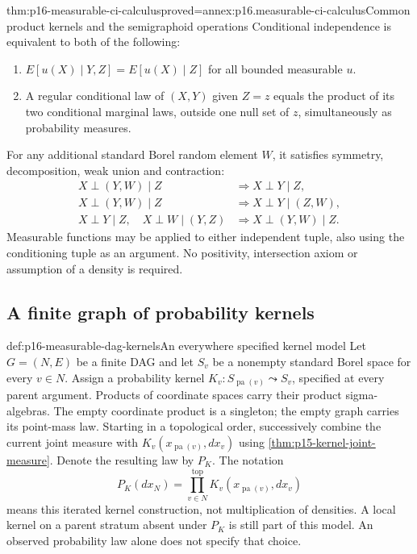 \begin{hbtheorem}{thm:p16-measurable-ci-calculus}{proved=annex:p16.measurable-ci-calculus}{Common product kernels and the semigraphoid operations}
Conditional independence is equivalent to both of the following:
\begin{enumerate}
\item \(E[u(X)\mid Y,Z]=E[u(X)\mid Z]\) for all bounded measurable \(u\).
\item A regular conditional law of \((X,Y)\) given \(Z=z\) equals
the product of its two conditional marginal laws, outside one null set
of \(z\), simultaneously as probability measures.
\end{enumerate}
For any additional standard Borel random element \(W\), it satisfies
symmetry, decomposition, weak union and contraction:
\[
\begin{aligned}
 X\perp(Y,W)\mid Z&\Longrightarrow X\perp Y\mid Z,\\
 X\perp(Y,W)\mid Z&\Longrightarrow X\perp Y\mid(Z,W),\\
 X\perp Y\mid Z,\quad X\perp W\mid(Y,Z)
     &\Longrightarrow X\perp(Y,W)\mid Z.
\end{aligned}
\]
Measurable functions may be applied to either independent tuple, also
using the conditioning tuple as an argument. No positivity, intersection
axiom or assumption of a density is required.
\end{hbtheorem}

\subsection{A finite graph of probability kernels}

\begin{hbdefinition}{def:p16-measurable-dag-kernels}{An everywhere specified kernel model}
Let \(G=(N,E)\) be a finite DAG and let \(S_v\) be a nonempty standard
Borel space for every \(v\in N\). Assign a probability kernel
\(K_v:S_{\operatorname{pa}(v)}\leadsto S_v\), specified at every parent
argument. Products of coordinate spaces carry their product sigma-algebras.
The empty coordinate product is a singleton; the empty graph carries its
point-mass law.
Starting in a topological order, successively combine the current joint
measure with \(K_v(x_{\operatorname{pa}(v)},dx_v)\) using
\cref{thm:p15-kernel-joint-measure}. Denote the resulting law by \(P_K\).
The notation
\[
 P_K(dx_N)=\mathop{\prod}_{v\in N}^{\mathrm{top}}
                         K_v(x_{\operatorname{pa}(v)},dx_v)
\]
means this iterated kernel construction, not multiplication of densities.
A local kernel on a parent stratum absent under \(P_K\) is still part of
this model. An observed probability law alone does not specify that choice.
\end{hbdefinition}

